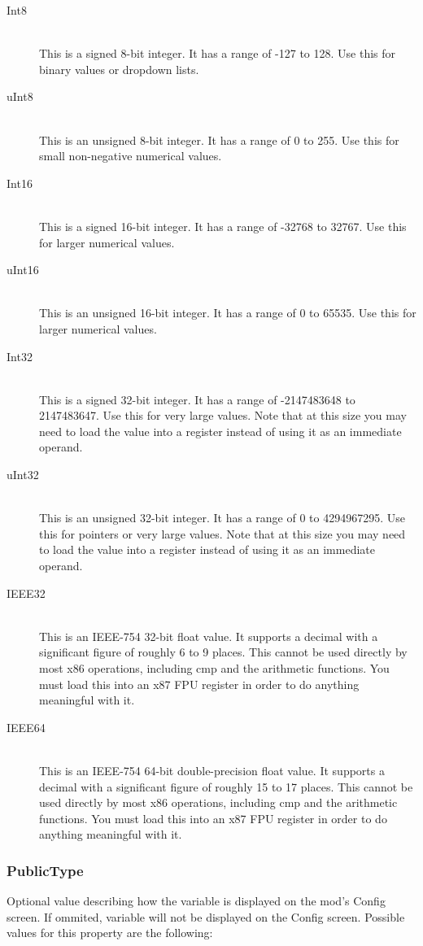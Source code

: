 \documentclass[12pt,a4paper,notitlepage]{article}
\begin{document}
\begin{description}
\item[Int8] \hfill \\ 
	This is a signed 8-bit integer. It has a range of -127 to 128. Use this for binary values or dropdown lists.
\item[uInt8] \hfill \\ 
	This is an unsigned 8-bit integer. It has a range of 0 to 255. Use this for small non-negative numerical values.
\item[Int16] \hfill \\
	This is a signed 16-bit integer. It has a range of -32768 to 32767. Use this for larger numerical values.
\item[uInt16] \hfill \\
	This is an unsigned 16-bit integer. It has a range of 0 to 65535. Use this for larger numerical values.
\item[Int32] \hfill \\
	This is a signed 32-bit integer. It has a range of -2147483648 to 2147483647. Use this for very large values. Note that at this size you may need to load the value into a register instead of using it as an immediate operand.
\item[uInt32] \hfill \\
	This is an unsigned 32-bit integer. It has a range of 0 to 4294967295. Use this for pointers or very large values. Note that at this size you may need to load the value into a register instead of using it as an immediate operand.
\item[IEEE32] \hfill \\
	This is an IEEE-754 32-bit float value. It supports a decimal with a significant figure of roughly 6 to 9 places. This cannot be used directly by most x86 operations, including cmp and the arithmetic functions. You must load this into an x87 FPU register in order to do anything meaningful with it.
\item[IEEE64] \hfill \\
	This is an IEEE-754 64-bit double-precision float value. It supports a decimal with a significant figure of roughly 15 to 17 places. This cannot be used directly by most x86 operations, including cmp and the arithmetic functions. You must load this into an x87 FPU register in order to do anything meaningful with it.
\end{description}

\subsubsection{PublicType}
\label{subsubsec:create-var-public}
Optional value describing how the variable is displayed on the mod's Config screen. If ommited, variable will not be displayed on the Config screen. Possible values for this property are the following:
\end{document}
